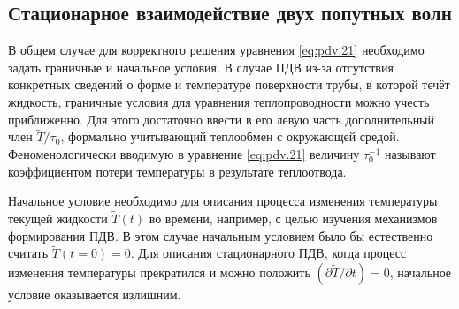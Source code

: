 \subsection{Стационарное взаимодействие двух попутных волн}

В общем случае для корректного решения уравнения \eqref{eq:pdv.21} необходимо задать граничные и начальное условия. В случае ПДВ из-за отсутствия конкретных сведений о форме и температуре поверхности трубы, в которой течёт жидкость, граничные условия для уравнения теплопроводности можно учесть приближенно. Для этого достаточно ввести в его левую часть дополнительный член $\tilde{T} / \tau_0$, формально учитывающий теплообмен с окружающей средой. 
Феноменологически вводимую в уравнение \eqref{eq:pdv.21} величину $\tau_0^{-1}$ называют коэффициентом потери температуры в результате теплоотвода.

Начальное условие необходимо для описания процесса изменения
температуры текущей жидкости $\tilde{T}(t)$ во времени, например, с целью изучения механизмов формирования ПДВ. В этом случае начальным условием было бы естественно считать $\tilde{T}(t=0) = 0$. Для описания стационарного ПДВ, когда процесс изменения температуры прекратился и можно положить $(\partial \tilde{T}  / \partial t) = 0$, начальное условие оказывается излишним.

